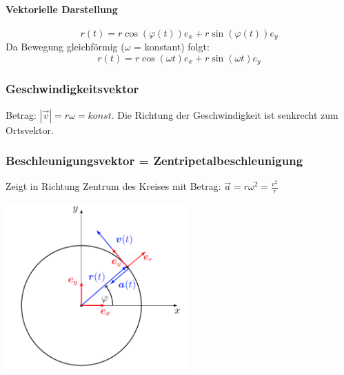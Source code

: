 \documentclass[7pt]{article}
\begin{document}
\begin{multicols}{3}
\paragraph{Vektorielle Darstellung}
\begin{equation*}
	r(t) = r \cos(\varphi(t))e_x + r \sin(\varphi(t))e_y
\end{equation*}
Da Bewegung gleichf{\"o}rmig ($\omega$ = konstant) folgt:
\begin{equation*}
	r(t) = r \cos(\omega t)e_x + r \sin(\omega t)e_y
\end{equation*}


\subsubsection{Geschwindigkeitsvektor}
Betrag: $|\vec{v}| = r \omega = konst.$ \newline
Die Richtung der Geschwindigkeit ist senkrecht zum Ortsvektor.

\subsubsection{Beschleunigungsvektor = Zentripetalbeschleunigung}
Zeigt in Richtung Zentrum des Kreises mit Betrag: $\vec{a} = r \omega ^2 = \frac{v^2}{r}$

\begin{center}
	\includegraphics[width=200pt]{images/beschleunigung_radial}
\end{center}



\end{multicols}
\end{document}
